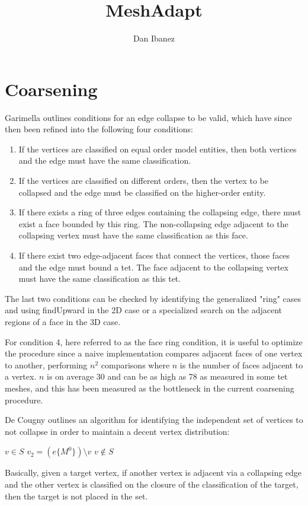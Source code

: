 \documentclass{article}
\title{MeshAdapt}
\author{Dan Ibanez}
\begin{document}
\maketitle

\section{Coarsening}

Garimella outlines conditions for an
edge collapse to be valid, which have since then been refined
into the following four conditions:
\begin{enumerate}
\item If the vertices are classified on equal order model entities,
then both vertices and the edge must have the same classification.
\item If the vertices are classified on different orders, then
the vertex to be collapsed and the edge must be classified on
the higher-order entity.
\item If there exists a ring of three edges containing the
collapsing edge, there must exist a face bounded by this ring.
The non-collapsing edge adjacent to the collapsing vertex
must have the same classification as this face.
\item If there exist two edge-adjacent faces that connect
the vertices, those faces and the edge must bound a tet.
The face adjacent to the collapsing vertex must
have the same classification as this tet.
\end{enumerate}

The last two conditions can be checked by identifying the generalized
"ring" cases and using findUpward in the 2D case or a specialized
search on the adjacent regions of a face in the 3D case.

For condition 4, here referred to as the face ring condition,
it is useful to optimize the procedure since a naive implementation
compares adjacent faces of one vertex to another, performing $n^2$
comparisons where $n$ is the number of faces adjacent to a vertex.
$n$ is on average 30 and can be as high as 78 as measured in some tet
meshes, and this has been measured as the bottleneck in the current
coarsening procedure.

De Cougny outlines an algorithm for identifying the independent set
of vertices to not collapse in order to maintain a decent vertex
distribution:
\begin{algorithmic}
\State $v \in S$
\State $v_2 = (e\{M^0\})\setminus v$
\State $v\not\in S$
\EndIf
\EndIf
\EndIf
\EndFor
\EndFor
\EndFor
\end{algorithmic}
Basically, given a target vertex, if another vertex is adjacent via
a collapsing edge and the other vertex is classified on the closure
of the classification of the target, then the target is not placed
in the set.
\end{document}
